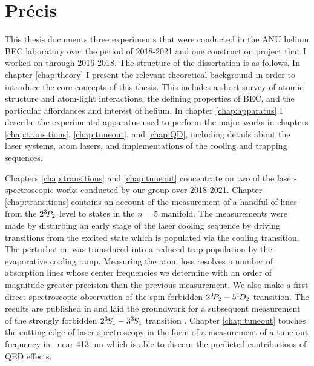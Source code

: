 	


\section*{Pr\'{e}cis}\label{sec:precis}


	This thesis documents three experiments that were conducted in the ANU helium BEC laboratory over the period of 2018-2021 and one construction project that I worked on through 2016-2018. The structure of the dissertation is as follows.
	In chapter \ref{chap:theory} I present the relevant theoretical background in order to introduce the core concepts of this thesis. This includes a short survey of atomic structure and atom-light interactions, the defining properties of BEC, and the particular affordances and interest of helium.
	In chapter \ref{chap:apparatus} I describe the experimental apparatus used to perform the major works in chapters \ref{chap:transitions}, \ref{chap:tuneout}, and \ref{chap:QD}, including details about the laser systems, atom lasers, and implementations of the cooling and trapping sequences.
	 
	Chapters \ref{chap:transitions} and \ref{chap:tuneout} concentrate on two of the laser-spectroscopic works conducted by our group over 2018-2021.
	Chapter \ref{chap:transitions} contains an account of the measurement of a handful of lines from the $2^{3\!} P_2$ level to states in the $n=5$ manifold. 
	The measurements were made by disturbing an early stage of the laser cooling sequence by driving transitions from the excited state which is populated via the cooling transition. 
	The perturbation was transduced into a reduced trap population by the evaporative cooling ramp. 
	Measuring the atom loss resolves a number of absorption lines whose center frequencies we determine with an order of magnitude greater precision than the previous measurement. We also make a first direct spectroscopic observation of the spin-forbidden $2^{3\!} P_2 - 5^{1\!} D_2$ transition. The results are published in \cite{Ross20} and laid the groundwork for a subsequent measurement of the strongly forbidden $2^{3\!} S_1 - 3 ^{3\!} S_1$ transition \cite{Thomas20}.
	Chapter \ref{chap:tuneout} touches the cutting edge of laser spectroscopy in the form of a measurement of a tune-out frequency in \mhe~near 413 nm which is able to discern the predicted contributions of QED effects. 
	
